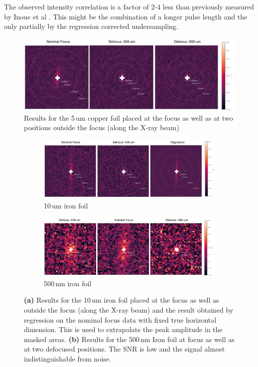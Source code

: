 The observed intensity correlation is a factor of 2-4 less than previously measured by Inoue et al \cite{inoue2019}. This might be the combination of a longer pulse length and the only partially by the regression corrected undersampling. 

\begin{figure}
	\centering
	\includegraphics[width=0.9\linewidth]{images/Cu5um_reco2d.pdf}
	\caption{Results for the 5\,um copper foil placed at the focus as well as at two positions outside the focus (along the X-ray beam) }
	\label{fig:Cu5umreco2d}
\end{figure}

\begin{figure}
	\centering
	\begin{subfigure}[b]{0.9\textwidth}
		\includegraphics[width=\linewidth]{images/Fe10um_reco2d.pdf}
		\caption{10\,um iron foil}
		\label{fig:fe10umreco2d}
	\end{subfigure}
	\begin{subfigure}[b]{0.9\textwidth}
		\includegraphics[width=\linewidth]{images/Fe500nm_reco2d.pdf}
		\caption{500\,nm iron foil}
		\label{fig:fe500nmreco2d}
	\end{subfigure}
	\caption[Results Iron Foils]{\textbf{(a)} Results for the 10\,um iron foil placed at the focus as well as outside the focus (along the X-ray beam) and the result obtained by regression on the nominal focus data with fixed true horizontal dimension. This is used to extrapolate the peak amplitude in the masked areas. \textbf{(b)} Results for the 500\,nm Iron foil at focus as well as at two defocused positions. The SNR is low and the signal almost indistinguishable from noise.}
	\label{fig:fereco2d}
\end{figure}


